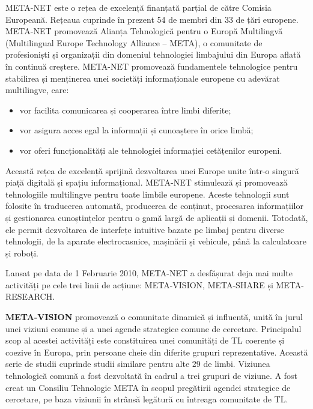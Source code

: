 \begin{multicols}{2}

META-NET este o rețea de excelență finanțată parțial de către Comisia Europeană. Rețeaua cuprinde în prezent 54 de membri din 33 de țări europene\cite{rehm2011}. META-NET promovează Alianța Tehnologică pentru o Europă Multilingvă (Multilingual Europe Technology Alliance -- META), o comunitate de profesioniști și organizații din domeniul tehnologiei limbajului din Europa aflată în continuă creștere. META-NET promovează fundamentele tehnologice pentru stabilirea și menținerea unei societăți informaționale europene cu adevărat multilingve, care:
\vspace*{-0.007 cm}
\begin{itemize}
\item vor facilita comunicarea și cooperarea între limbi diferite;
\item vor asigura acces egal la informații și cunoaștere în orice limbă;
\item vor oferi funcționalități ale tehnologiei informației cetățenilor europeni.
\end{itemize}

Această rețea de excelență sprijină dezvoltarea unei Europe unite într-o singură piață digitală și spațiu informațional. META-NET stimulează și promovează tehnologiile multilingve pentru toate limbile europene. Aceste tehnologii sunt folosite în traducerea automată, producerea de conținut, procesarea informațiilor și gestionarea cunoștințelor pentru o gamă largă de aplicații și domenii. Totodată, ele permit dezvoltarea de interfețe intuitive bazate pe limbaj pentru diverse tehnologii, de la aparate electrocasnice, mașinării și vehicule, până la calculatoare și roboți.

Lansat pe data de 1 Februarie 2010, META-NET a desfășurat deja mai multe activități pe cele trei linii de acțiune: META-VISION, META-SHARE și META-RESEARCH.

\textbf{META-VISION} promovează o comunitate dinamică și influentă, unită în jurul unei viziuni comune și a unei agende strategice comune de cercetare. Principalul scop al acestei activități este constituirea unei comunități de TL coerente și coezive în Europa, prin persoane cheie din diferite grupuri reprezentative. Această serie de studii cuprinde studii similare pentru alte 29 de limbi. Viziunea tehnologică comună a fost dezvoltată în cadrul a trei grupuri de viziune. A fost creat un Consiliu Tehnologic META în scopul pregătirii agendei strategice de cercetare, pe baza viziunii în strânsă legătură cu întreaga comunitate de TL.%


\end{multicols}
